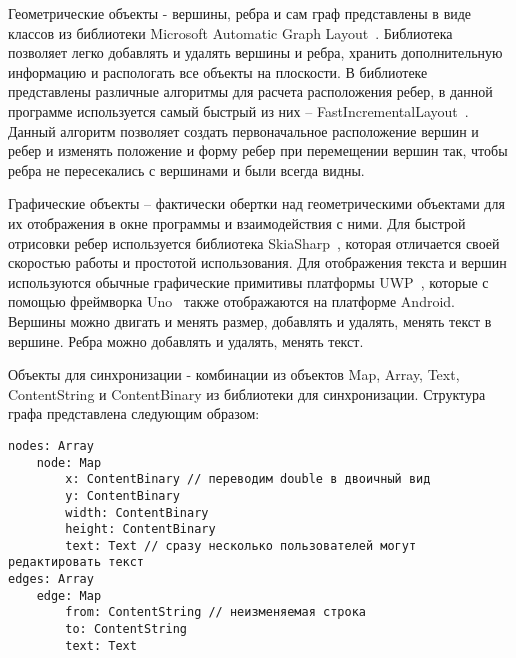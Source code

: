 \documentclass[a4paper,12pt]{article}
\begin{document}
    Геометрические объекты - вершины, ребра и сам граф представлены в виде классов из библиотеки Microsoft Automatic Graph Layout~\cite{MSAGL}. Библиотека позволяет легко добавлять и удалять вершины и ребра, хранить дополнительную информацию и распологать все объекты на плоскости. В библиотеке представлены различные алгоритмы для расчета расположения ребер, в данной программе используется самый быстрый из них -- FastIncrementalLayout~\cite{FastIncrementalLayout}. Данный алгоритм позволяет создать первоначальное расположение вершин и ребер и изменять положение и форму ребер при перемещении вершин так, чтобы ребра не пересекались с вершинами и были всегда видны.

    Графические объекты -- фактически обертки над геометрическими объектами для их отображения в окне программы и взаимодействия с ними. Для быстрой отрисовки ребер используется библиотека SkiaSharp~\cite{SkiaSharp}, которая отличается своей скоростью работы и простотой использования. Для отображения текста и вершин используются обычные графические примитивы платформы UWP~\cite{UWP}, которые с помощью фреймворка Uno~\cite{Uno} также отображаются на платформе Android. Вершины можно двигать и менять размер, добавлять и удалять, менять текст в вершине. Ребра можно добавлять и удалять, менять текст.

    Объекты для синхронизации - комбинации из объектов Map, Array, Text, ContentString и ContentBinary из библиотеки для синхронизации. Структура графа представлена следующим образом:

    \begin{verbatim}
nodes: Array
    node: Map
        x: ContentBinary // переводим double в двоичный вид
        y: ContentBinary
        width: ContentBinary
        height: ContentBinary
        text: Text // сразу несколько пользователей могут редактировать текст
edges: Array
    edge: Map
        from: ContentString // неизменяемая строка
        to: ContentString
        text: Text
    \end{verbatim}
\end{document}

